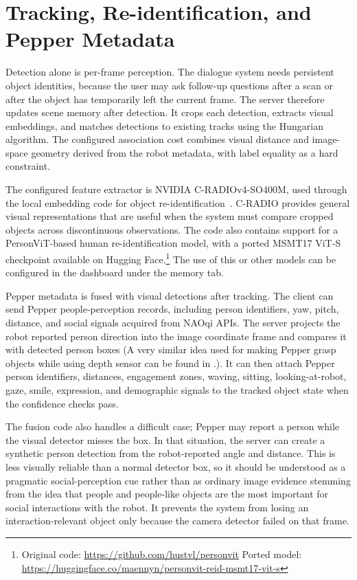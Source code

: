 \section{Tracking, Re-identification, and Pepper Metadata}\label{sec:server-pepper-fusion}

Detection alone is per-frame perception. The dialogue system needs persistent object identities, because the user may ask follow-up questions after a scan or after the object has temporarily left the current frame. The server therefore updates scene memory after detection. It crops each detection, extracts visual embeddings, and matches detections to existing tracks using the Hungarian algorithm. The configured association cost combines visual distance and image-space geometry derived from the robot metadata, with label equality as a hard constraint. %

The configured feature extractor is NVIDIA C-RADIOv4-SO400M, used through the local embedding code for object re-identification~\cite{ranzinger2026cradiov4techreport,nvidia_cradiov4_so400m_2026}. C-RADIO provides general visual representations that are useful when the system must compare cropped objects across discontinuous observations. The code also contains support for a PersonViT-based human re-identification model, with a ported MSMT17 ViT-S checkpoint available on Hugging Face.\footnote{Original code: \url{https://github.com/hustvl/personvit} Ported model: \url{https://huggingface.co/maennyn/personvit-reid-msmt17-vit-s}} The use of this or other models can be configured in the dashboard under the memory tab.

Pepper metadata is fused with visual detections after tracking. The client can send Pepper people-perception records, including person identifiers, yaw, pitch, distance, and social signals acquired from NAOqi APIs. The server projects the robot reported person direction into the image coordinate frame and compares it with detected person boxes (A very similar idea used for making Pepper grasp objects while using depth sensor can be found in \cite[4]{wang_target_2024}.). It can then attach Pepper person identifiers, distances, engagement zones, waving, sitting, looking-at-robot, gaze, smile, expression, and demographic signals to the tracked object state when the confidence checks pass.

The fusion code also handles a difficult case; Pepper may report a person while the visual detector misses the box. In that situation, the server can create a synthetic person detection from the robot-reported angle and distance. This is less visually reliable than a normal detector box, so it should be understood as a pragmatic social-perception cue rather than as ordinary image evidence stemming from the idea that people and people-like objects are the most important for social interactions with the robot. It prevents the system from losing an interaction-relevant object only because the camera detector failed on that frame.

